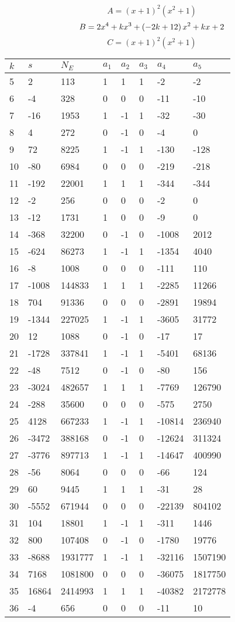 \documentclass{amsart}
\begin{document}
$$A=(x
 + 1)^{2}(x^2
 + 1)$$
$$B=2\*x^4
 + k\*x^3
 + \left(-2\*k
 + 12\right) \*x^2
 + k\*x
 + 2$$
$$C=(x
 + 1)^{2}(x^2
 + 1)$$
\begin{longtable}{|l|l|l|lllll|}
\hline
$k$ & $s$ & $N_E$ & $a_1$ & $a_2$ & $a_3$ & $a_4$ & $a_5$\\
\hline
5&2&113&1&1&1&-2&-2\\
6&-4&328&0&0&0&-11&-10\\
7&-16&1953&1&-1&1&-32&-30\\
8&4&272&0&-1&0&-4&0\\
9&72&8225&1&-1&1&-130&-128\\
10&-80&6984&0&0&0&-219&-218\\
11&-192&22001&1&1&1&-344&-344\\
12&-2&256&0&0&0&-2&0\\
13&-12&1731&1&0&0&-9&0\\
14&-368&32200&0&-1&0&-1008&2012\\
15&-624&86273&1&-1&1&-1354&4040\\
16&-8&1008&0&0&0&-111&110\\
17&-1008&144833&1&1&1&-2285&11266\\
18&704&91336&0&0&0&-2891&19894\\
19&-1344&227025&1&-1&1&-3605&31772\\
20&12&1088&0&-1&0&-17&17\\
21&-1728&337841&1&-1&1&-5401&68136\\
22&-48&7512&0&-1&0&-80&156\\
23&-3024&482657&1&1&1&-7769&126790\\
24&-288&35600&0&0&0&-575&2750\\
25&4128&667233&1&-1&1&-10814&236940\\
26&-3472&388168&0&-1&0&-12624&311324\\
27&-3776&897713&1&-1&1&-14647&400990\\
28&-56&8064&0&0&0&-66&124\\
29&60&9445&1&1&1&-31&28\\
30&-5552&671944&0&0&0&-22139&804102\\
31&104&18801&1&-1&1&-311&1446\\
32&800&107408&0&-1&0&-1780&19776\\
33&-8688&1931777&1&-1&1&-32116&1507190\\
34&7168&1081800&0&0&0&-36075&1817750\\
35&16864&2414993&1&1&1&-40382&2172778\\
36&-4&656&0&0&0&-11&10\\

\end{longtable}
\end{document}
